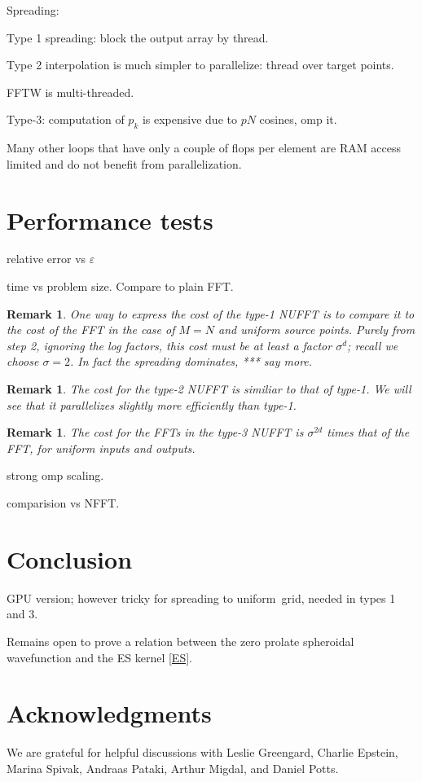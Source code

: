 \documentclass[10pt]{article}
\newcommand{\eps}{\varepsilon}
\newtheorem{rmk}[thm]{Remark}
\newcommand{\U}{{uniform}}
\newcommand{\rat}{\sigma}          %
\begin{document}
Spreading:

Type 1 spreading:
block the output array by thread.

Type 2 interpolation is much simpler to parallelize:
thread over target points.

FFTW is multi-threaded.

Type-3:
computation of $p_k$ is expensive due to $pN$ cosines,
omp it.

Many other loops that have only a couple of flops
per element are RAM access limited and do not benefit
from parallelization.


\section{Performance tests}

relative error vs $\eps$

time vs problem size.
Compare to plain FFT.

\begin{rmk}
  One way to express the cost of the type-1 NUFFT
  is to compare it to the cost of the FFT in the case of $M=N$
  and uniform source points.
  Purely from step 2, ignoring the log factors,
  this cost must be at least a factor $\rat^d$; recall we choose $\rat=2$.
  In fact the spreading dominates,
  *** say more.
\end{rmk}
\begin{rmk}
  The cost for the type-2 NUFFT is similiar to that of type-1.
  We will see that it parallelizes slightly more efficiently
  than type-1.
\end{rmk}
\begin{rmk}
  The cost for the FFTs in the type-3 NUFFT is $\rat^{2d}$ times that of
  the FFT, for uniform inputs and outputs.
\end{rmk}




strong omp scaling.

comparision vs NFFT.


\section{Conclusion}



GPU version; however tricky for spreading to \U\ grid, needed in types 1 and 3.


Remains open to prove a relation between the zero prolate spheroidal
wavefunction and the ES kernel \eqref{ES}.


\section*{Acknowledgments}

We are grateful for helpful discussions with Leslie Greengard,
Charlie Epstein, Marina Spivak, Andraas Pataki, Arthur Migdal, and
Daniel Potts.




\end{document}

